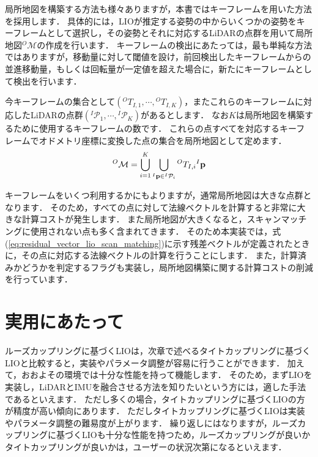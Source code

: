 局所地図を構築する方法も様々ありますが，本書ではキーフレームを用いた方法を採用します．
具体的には，LIOが推定する姿勢の中からいくつかの姿勢をキーフレームとして選択し，その姿勢とそれに対応するLiDARの点群を用いて局所地図${}^{O}\mathcal{M}$の作成を行います．
キーフレームの検出にあたっては，最も単純な方法ではありますが，移動量に対して閾値を設け，前回検出したキーフレームからの並進移動量，もしくは回転量が一定値を超えた場合に，新たにキーフレームとして検出を行います．

今キーフレームの集合として$\left( {}^{O}T_{I, 1}, \cdots, {}^{O}T_{I, K} \right)$，またこれらのキーフレームに対応したLiDARの点群$\left( {}^{I}\mathcal{P}_{1}, \cdots, {}^{I}\mathcal{P}_{K} \right)$があるとします．
なお$K$は局所地図を構築するために使用するキーフレームの数です．
これらの点すべてを対応するキーフレームでオドメトリ座標に変換した点の集合を局所地図として定めます．
%
\begin{align}
  {}^{O}\mathcal{M} = \bigcup_{i=1}^{K} \bigcup_{{}^{I}{\bf p} \in {}^{I}\mathcal{P}_{i}} {}^{O}T_{I, i} {}^{I}{\bf p}
\end{align}
%

キーフレームをいくつ利用するかにもよりますが，通常局所地図は大きな点群となります．
そのため，すべての点に対して法線ベクトルを計算すると非常に大きな計算コストが発生します．
また局所地図が大きくなると，スキャンマッチングに使用されない点も多く含まれてきます．
そのため本実装では，式(\ref{eq:residual_vector_lio_scan_matching})に示す残差ベクトルが定義されたときに，その点に対応する法線ベクトルの計算を行うことにします．
また，計算済みかどうかを判定するフラグも実装し，局所地図構築に関する計算コストの削減を行っています．















\section{実用にあたって}

ルーズカップリングに基づくLIOは，次章で述べるタイトカップリングに基づくLIOと比較すると，実装やパラメータ調整が容易に行うことができます．
加えて，おおよその環境では十分な性能を持って機能します．
そのため，まずLIOを実装し，LiDARとIMUを融合させる方法を知りたいという方には，適した手法であるといえます．
ただし多くの場合，タイトカップリングに基づくLIOの方が精度が高い傾向にあります．
ただしタイトカップリングに基づくLIOは実装やパラメータ調整の難易度が上がります．
繰り返しにはなりますが，ルーズカップリングに基づくLIOも十分な性能を持つため，ルーズカップリングが良いかタイトカップリングが良いかは，ユーザーの状況次第になるといえます．

